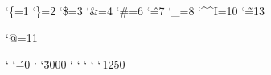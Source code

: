 
\catcode`\{=1
\catcode`\}=2
\catcode`\$=3
\catcode`\&=4
\catcode`\#=6
\catcode`\^=7
\catcode`\_=8
\catcode`\^^I=10
\catcode`\~=13

\catcode`@=11

\sfcode` \sfcode`\'=0 \sfcode` \sfcode`\.3000 \sfcode`
\sfcode` \sfcode` \sfcode` \sfcode`\,1250


